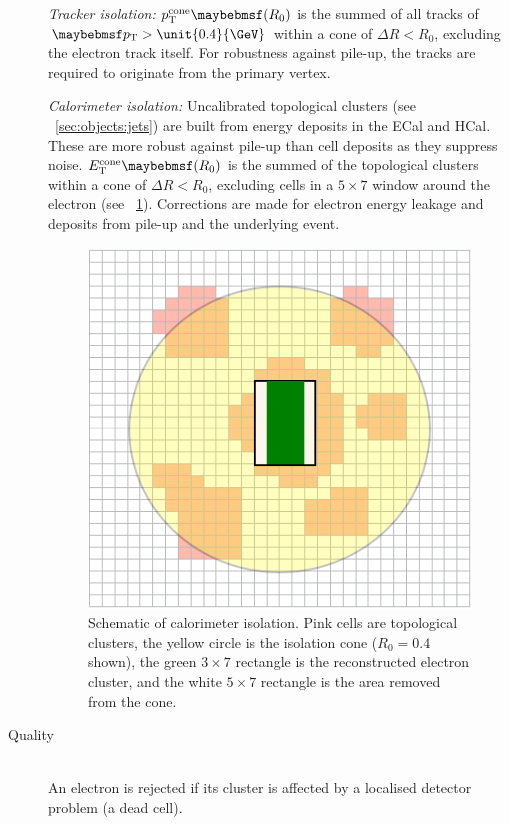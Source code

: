 \begin{description}
	\textit{Tracker isolation:} $p_{\text{T}}^{\text{cone}}\parenths{R_0}$ is the summed 
	\pt of all tracks of $\pt > \unit{0.4}{\GeV}$ within a cone of $\Delta R < R_0$, 
	excluding the electron track itself. For robustness against pile-up, the tracks are 
	required to originate from the primary vertex.

	\textit{Calorimeter isolation:} Uncalibrated topological clusters (see 
	\Section~\ref{sec:objects:jets}) are built from energy deposits in the \ac{ECal} 
	and \ac{HCal}. These are more robust against pile-up than cell deposits as they 
	suppress noise. $E_{\text{T}}^{\text{cone}}\parenths{R_0}$ is the summed \et of the 
	topological clusters within a cone of $\Delta R < R_0$, excluding cells in a 
	$5 \times 7$ window around the electron (see \Figure~\ref{fig:objects:el_iso}). 
	Corrections are made for electron energy leakage and deposits from pile-up and the 
	underlying event.

	\begin{figure}
		\includegraphics[width=0.8\smallfigwidth]{tex/selection/el_isolation}
		\caption{Schematic of calorimeter isolation. Pink cells are topological clusters, 
		the yellow circle is the isolation cone ($R_0 = 0.4$ shown), the green 
		$3 \times 7$ rectangle is the reconstructed electron cluster, 
		and the white $5 \times 7$ rectangle is the area removed from the cone.}
		\label{fig:objects:el_iso}
	\end{figure}

\item[Quality] \hfill \\
	An electron is rejected if its cluster is affected by a localised detector problem 
	(\eg a dead cell).


\end{description}
